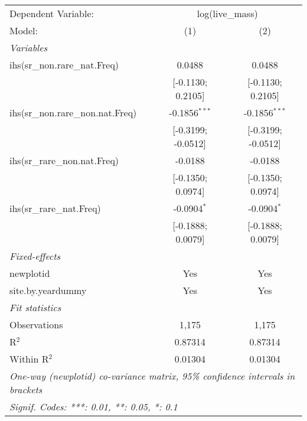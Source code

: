 \begin{tabular}{lcc}
\tabularnewline\midrule\midrule
Dependent Variable:&\multicolumn{2}{c}{log(live\_mass)}\\
Model:&(1) & (2)\\
\midrule \emph{Variables}&   &  \\
ihs(sr\_non.rare\_nat.Freq)&0.0488 & 0.0488\\
  &[-0.1130; 0.2105] & [-0.1130; 0.2105]\\
ihs(sr\_non.rare\_non.nat.Freq)&-0.1856$^{***}$ & -0.1856$^{***}$\\
  &[-0.3199; -0.0512] & [-0.3199; -0.0512]\\
ihs(sr\_rare\_non.nat.Freq)&-0.0188 & -0.0188\\
  &[-0.1350; 0.0974] & [-0.1350; 0.0974]\\
ihs(sr\_rare\_nat.Freq)&-0.0904$^{*}$ & -0.0904$^{*}$\\
  &[-0.1888; 0.0079] & [-0.1888; 0.0079]\\
\midrule \emph{Fixed-effects}&   &  \\
newplotid & Yes & Yes\\
site.by.yeardummy & Yes & Yes\\
\midrule \emph{Fit statistics}&  & \\
Observations & 1,175&1,175\\
R$^2$ & 0.87314&0.87314\\
Within R$^2$ & 0.01304&0.01304\\
\midrule\midrule\multicolumn{3}{l}{\emph{One-way (newplotid) co-variance matrix, 95\% confidence intervals in brackets}}\\
\multicolumn{3}{l}{\emph{Signif. Codes: ***: 0.01, **: 0.05, *: 0.1}}\\
\end{tabular}


